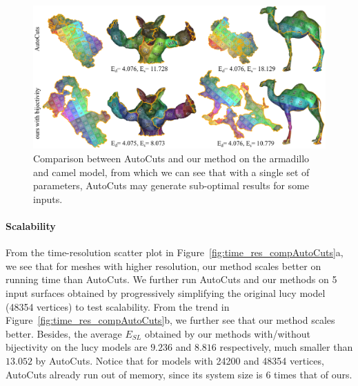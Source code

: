\begin{figure}[!h]
\centering
\includegraphics[width=\linewidth]{fig/comp_AutoCuts.png}
\caption{Comparison between AutoCuts and our method on the armadillo and camel model, from which we can see that with a single set of parameters, AutoCuts may generate sub-optimal results for some inputs.}
\label{fig:comp_AutoCuts}
\end{figure}

\paragraph{Scalability}
From the time-resolution scatter plot in Figure~\ref{fig:time_res_compAutoCuts}a, we see that for meshes with higher resolution, our method scales better on running time than AutoCuts.
We further run AutoCuts and our methods on 5 input surfaces obtained by progressively simplifying the original lucy model (48354 vertices) to test scalability. From the trend in Figure~\ref{fig:time_res_compAutoCuts}b, we further see that our method scales better. Besides, the average $E_{SL}$ obtained by our methods with/without bijectivity on the lucy models are $9.236$ and $8.816$ respectively, much smaller than $13.052$ by AutoCuts. Notice that for models with 24200 and 48354 vertices, AutoCuts already run out of memory, since its system size is $6$ times that of ours.

